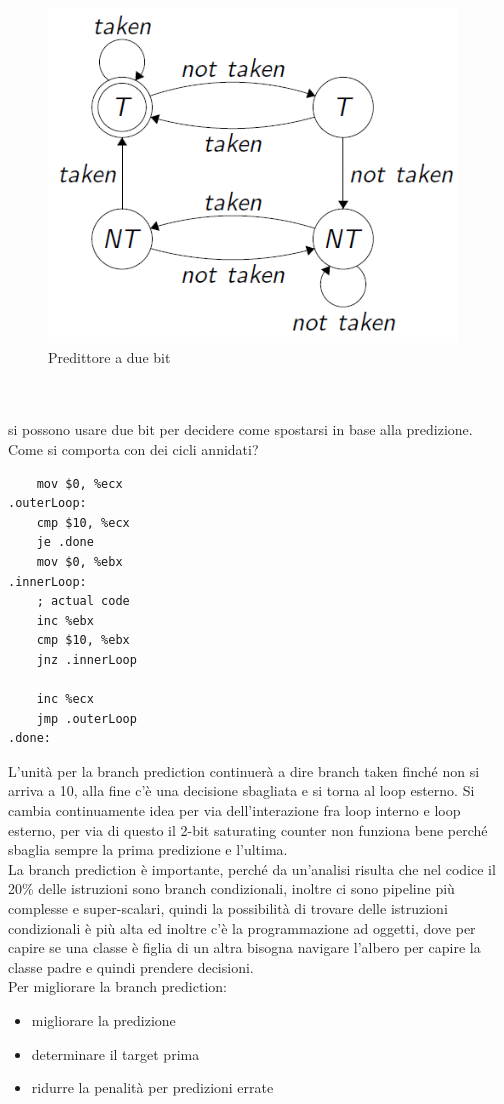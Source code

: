\documentclass[12pt, oneside]{extbook} %
\begin{document}
\begin{figure}[!h]
	\includegraphics[scale=0.7]{immagini/2bit_pred}
	\caption{Predittore a due bit}
\end{figure}\\\\
si possono usare due bit per decidere come spostarsi in base alla predizione. Come si comporta con dei cicli annidati?
\begin{lstlisting}
	mov $0, %ecx
.outerLoop:
	cmp $10, %ecx
	je .done
	mov $0, %ebx
.innerLoop:
	; actual code
	inc %ebx
	cmp $10, %ebx
	jnz .innerLoop
	
	inc %ecx
	jmp .outerLoop
.done:
\end{lstlisting}
L'unità per la branch prediction continuerà a dire branch taken finché non si arriva a 10, alla fine c'è una decisione sbagliata e si torna al loop esterno. Si cambia continuamente idea per via dell'interazione fra loop interno e loop esterno, per via di questo il 2-bit saturating counter non funziona bene perché sbaglia sempre la prima predizione e l'ultima.\\ La branch prediction è importante, perché da un'analisi risulta che nel codice il 20\% delle istruzioni sono branch condizionali, inoltre ci sono pipeline più complesse e super-scalari, quindi la possibilità di trovare delle istruzioni condizionali è più alta ed inoltre c'è la programmazione ad oggetti, dove per capire se una classe è figlia di un altra bisogna navigare l'albero per capire la classe padre e quindi prendere decisioni.\\ Per migliorare la branch prediction:
\begin{itemize}
\item migliorare la predizione
\item determinare il target prima
\item ridurre la penalità per predizioni errate
\end{itemize}
\end{document}
